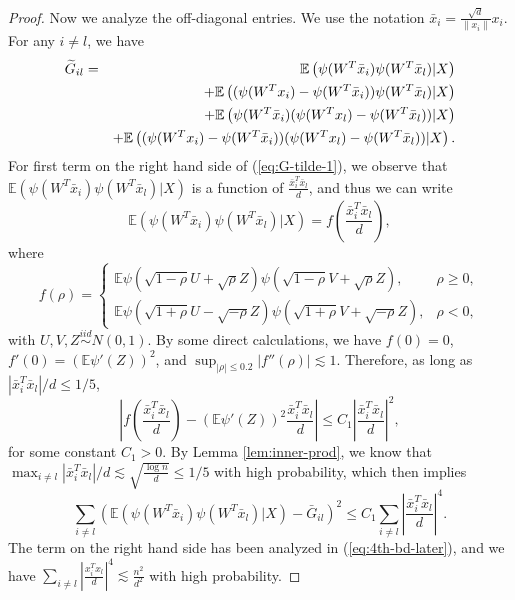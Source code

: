 \begin{proof}
Now we analyze the off-diagonal entries. We use the notation $\bar{x}_i=\frac{\sqrt{d}}{\|x_i\|}x_i$. For any $i\neq l$, we have
\begin{eqnarray}
\label{eq:G-tilde-1} \wt{G}_{il} &=& \mathbb{E}\left(\psi(W^T\bar{x}_i)\psi(W^T\bar{x}_l)|X\right) \\
\label{eq:G-tilde-2} && + \mathbb{E}\left((\psi(W^Tx_i)-\psi(W^T\bar{x}_i))\psi(W^T\bar{x}_l)|X\right) \\
\label{eq:G-tilde-3} && + \mathbb{E}\left(\psi(W^T\bar{x}_i)(\psi(W^Tx_l)-\psi(W^T\bar{x}_l))|X\right) \\
\label{eq:G-tilde-4} && + \mathbb{E}\left((\psi(W^Tx_i)-\psi(W^T\bar{x}_i))(\psi(W^Tx_l)-\psi(W^T\bar{x}_l))|X\right).
\end{eqnarray}
For first term on the right hand side of (\ref{eq:G-tilde-1}), we observe that $\mathbb{E}\left(\psi(W^T\bar{x}_i)\psi(W^T\bar{x}_l)|X\right)$ is a function of $\frac{\bar{x}_i^T\bar{x}_l}{d}$, and thus we can write
$$\mathbb{E}\left(\psi(W^T\bar{x}_i)\psi(W^T\bar{x}_l)|X\right)=f\left(\frac{\bar{x}_i^T\bar{x}_l}{d}\right),$$
where
$$f(\rho) = \begin{cases}
\mathbb{E}\psi(\sqrt{1-\rho}U+\sqrt{\rho}Z)\psi(\sqrt{1-\rho}V+\sqrt{\rho}Z), & \rho \geq 0, \\
\mathbb{E}\psi(\sqrt{1+\rho}U-\sqrt{-\rho}Z)\psi(\sqrt{1+\rho}V+\sqrt{-\rho}Z), & \rho < 0,
\end{cases}$$
with $U,V,Z\stackrel{iid}{\sim} N(0,1)$. By some direct calculations, we have $f(0)=0$, $f'(0)=(\mathbb{E}\psi'(Z))^2$, and $\sup_{|\rho|\leq 0.2}|f''(\rho)|\lesssim 1$. Therefore, as long as $|\bar{x}_i^T\bar{x}_l|/d\leq 1/5$,
$$\left|f\left(\frac{\bar{x}_i^T\bar{x}_l}{d}\right)-(\mathbb{E}\psi'(Z))^2\frac{\bar{x}_i^T\bar{x}_l}{d}\right|\leq C_1\left|\frac{\bar{x}_i^T\bar{x}_l}{d}\right|^2,$$
for some constant $C_1>0$. By Lemma \ref{lem:inner-prod}, we know that $\max_{i\neq l}|\bar{x}_i^T\bar{x}_l|/d\lesssim \sqrt{\frac{\log n}{d}}\leq 1/5$ with high probability, which then implies
\begin{equation}
\sum_{i\neq l}\left(\mathbb{E}\left(\psi(W^T\bar{x}_i)\psi(W^T\bar{x}_l)|X\right)-\bar{G}_{il}\right)^2 \leq C_1\sum_{i\neq l}\left|\frac{\bar{x}_i^T\bar{x}_l}{d}\right|^4. \label{eq:G-H}
\end{equation}
The term on the right hand side has been analyzed in (\ref{eq:4th-bd-later}), and we have $\sum_{i\neq l}\left|\frac{x_i^Tx_l}{d}\right|^4\lesssim \frac{n^2}{d^2}$ with high probability.


\end{proof}
